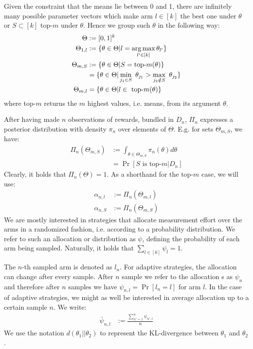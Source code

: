Given the constraint that the means lie between 0 and 1, there are infinitely many possible parameter vectors which make arm $l \in [k]$ the best one under $\theta$ or $S \subset [k]$ top-$m$ under $\theta$. Hence we group such $\theta$ in the following way:
\begin{align}
  \Theta &:= [0, 1]^k \\
  \Theta_{1, l} &:= \{\theta \in \Theta | l = \operatorname*{arg\,max}_{l' \in [k]} \theta_{l'}\} \\
  \Theta_{m, S} &:= \{\theta \in \Theta | S = \text{top-}m(\theta)\} \\
    &= \{ \theta \in \Theta| \min_{j_1 \in S}\ \theta_{j_1} > \max_{j_2 \notin S}\ \theta_{j_2}\} \\
  \Theta_{m, l} &= \{\theta \in \Theta | l \in \text{ top-}m(\theta)\}
\end{align}
where top-$m$ returns the $m$ highest values, i.e. means, from its argument $\theta$.

After having made $n$ observations of rewards, bundled in $D_n$, $\Pi_n$ expresses a posterior distribution with density $\pi_n$ over elements of $\Theta$. E.g. for sets $\Theta_{m, S}$, we have:
\begin{align}
  \Pi_n(\Theta_{m, S}) &:= \int_{\theta \in \Theta_{m, S}} \pi_n(\theta) d\theta \\
    &= \Pr[S \text{ is top-}m | D_n]
\end{align}
Clearly, it holds that $\Pi_n(\Theta) = 1$. As a shorthand for the top-$m$ case, we will use:
\begin{align}
  \alpha_{n, l} &:= \Pi_n(\Theta_{m, l}) \\
  \alpha_{n, S} &:= \Pi_n(\Theta_{m, S})
\end{align}
We are mostly interested in strategies that allocate measurement effort over the arms in a randomized fashion, i.e. according to a probability distribution. We refer to such an allocation or distribution as $\psi$, defining the probability of each arm being sampled. Naturally, it holds that $\sum_{l \in [k]} \psi_l = 1$.

The $n$-th sampled arm is denoted as $l_n$. For adaptive strategies, the allocation can change after every sample. After $n$ sample we refer to the allocation s as $\psi_{n}$ and therefore after $n$ samples we have $\psi_{n, l} = \Pr[l_n = l]$ for arm $l$. In the case of adaptive strategies, we might as well be interested in average allocation up to a certain sample $n$. We write:
\begin{align}
  \bar{\psi}_{n, l} &:= \frac{\sum_{n' = 1}^{n} \psi_{n', l}}{n}
\end{align}
We use the notation $d(\theta_1||\theta_2)$ to represent the KL-divergence between $\theta_1$ and $\theta_2$.

